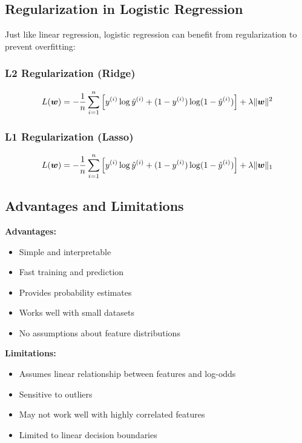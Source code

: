 \subsection{Regularization in Logistic Regression}

Just like linear regression, logistic regression can benefit from regularization to prevent overfitting:

\subsubsection{L2 Regularization (Ridge)}

\begin{equation}
L(\boldsymbol{w}) = -\frac{1}{n} \sum_{i=1}^{n} \left[y^{(i)} \log \hat{y}^{(i)} + (1-y^{(i)}) \log(1-\hat{y}^{(i)})\right] + \lambda \|\boldsymbol{w}\|^2
\end{equation}

\subsubsection{L1 Regularization (Lasso)}

\begin{equation}
L(\boldsymbol{w}) = -\frac{1}{n} \sum_{i=1}^{n} \left[y^{(i)} \log \hat{y}^{(i)} + (1-y^{(i)}) \log(1-\hat{y}^{(i)})\right] + \lambda \|\boldsymbol{w}\|_1
\end{equation}

\subsection{Advantages and Limitations}

\textbf{Advantages:}
\begin{itemize}
    \item Simple and interpretable
    \item Fast training and prediction
    \item Provides probability estimates
    \item Works well with small datasets
    \item No assumptions about feature distributions
\end{itemize}

\textbf{Limitations:}
\begin{itemize}
    \item Assumes linear relationship between features and log-odds
    \item Sensitive to outliers
    \item May not work well with highly correlated features
    \item Limited to linear decision boundaries
\end{itemize}

